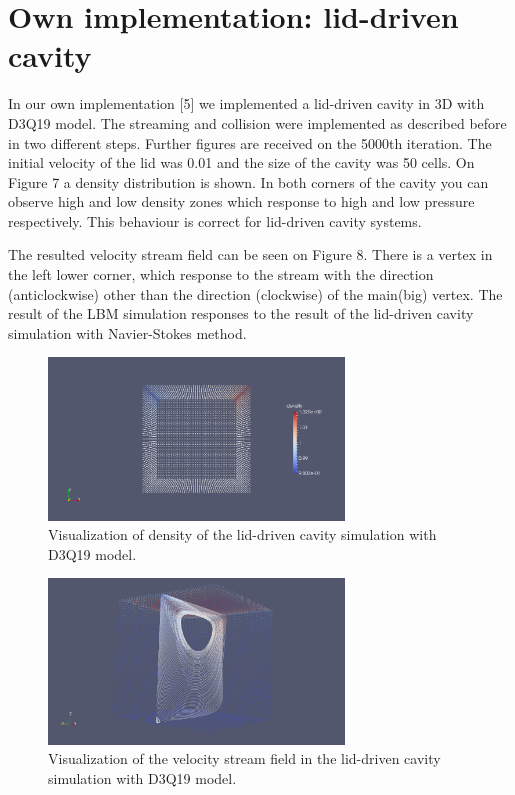 
\section{Own implementation: lid-driven cavity}

In our own implementation [5] we implemented a lid-driven cavity in 3D with D3Q19 model. The streaming and collision were implemented as described before in two different steps. Further figures are received on the 5000th iteration. The initial velocity of the lid was 0.01 and the size of the cavity was 50 cells. On Figure 7 a density distribution is shown. In both corners of the cavity you can observe high and low density zones which response to high and low pressure respectively. This behaviour is correct for lid-driven cavity systems. 

The resulted velocity stream field can be seen on Figure 8. There is a vertex in the left lower corner, which response to the stream with the direction (anticlockwise) other than the direction (clockwise) of the main(big) vertex. The result of the LBM simulation responses to the result of the lid-driven cavity simulation with Navier-Stokes method.

\begin{figure}[H]
  \centering
  \includegraphics[width=0.7\textwidth]{img/fig10.png}
  \caption{Visualization of density of the lid-driven cavity simulation with D3Q19 model.}
\end{figure}

\begin{figure}[H]
  \centering
  \includegraphics[width=0.7\textwidth]{img/fig11.png}
  \caption{Visualization of the velocity stream field in the lid-driven cavity simulation with D3Q19 model.}
\end{figure}